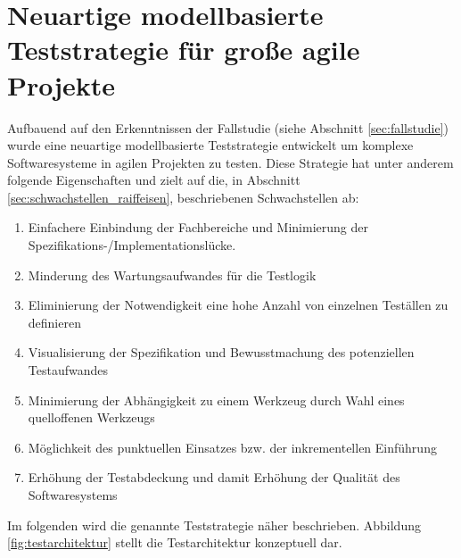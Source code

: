 \chapter{Neuartige modellbasierte Teststrategie für große agile Projekte}
\label{sec:results}

Aufbauend auf den Erkenntnissen der Fallstudie (siehe Abschnitt \ref{sec:fallstudie}) wurde eine neuartige modellbasierte Teststrategie entwickelt um komplexe Softwaresysteme in agilen Projekten zu testen. Diese Strategie hat unter anderem folgende Eigenschaften und zielt auf die, in Abschnitt \ref{sec:schwachstellen_raiffeisen}, beschriebenen Schwachstellen ab:

\begin{enumerate}
\item Einfachere Einbindung der Fachbereiche und Minimierung der Spezifikations-/Implementationslücke.
\item Minderung des Wartungsaufwandes für die Testlogik
\item Eliminierung der Notwendigkeit eine hohe Anzahl von einzelnen Teställen zu definieren
\item Visualisierung der Spezifikation und Bewusstmachung des potenziellen Testaufwandes
\item Minimierung der Abhängigkeit zu einem Werkzeug durch Wahl eines quelloffenen Werkzeugs
\item Möglichkeit des punktuellen Einsatzes bzw. der inkrementellen Einführung
\item Erhöhung der Testabdeckung und damit Erhöhung der Qualität des Softwaresystems
\end{enumerate}

Im folgenden wird die genannte Teststrategie näher beschrieben. Abbildung \ref{fig:testarchitektur} stellt die Testarchitektur konzeptuell dar.

